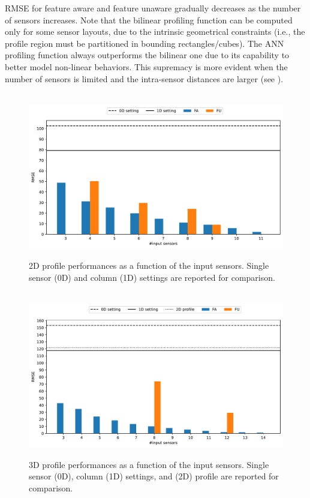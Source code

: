 RMSE for feature aware and feature unaware gradually decreases as the number of sensors increases. 
Note that the bilinear profiling function can be computed only for some sensor layouts, due to the intrinsic geometrical constraints (i.e., the profile region must be partitioned in bounding rectangles/cubes). 
The ANN profiling function always outperforms the bilinear one due to its capability to better model non-linear behaviors. 
This supremacy is more evident when the number of sensors is limited and the intra-sensor distances are larger (see ). 
\begin{figure}[t]
\centering\
\includegraphics[scale=.5]{chapters/physics-aware/pluto/img/bar_plot.pdf}
\caption{2D profile performances as a function of the input  sensors. Single sensor (0D) and column (1D) settings are reported for comparison. }
\label{pluto-fig:2Dperformance}
\end{figure}

\begin{figure}[t]
\centering\
\includegraphics[scale=.5]{chapters/physics-aware/pluto/img/3d_bar_plot.pdf}
\caption{3D profile performances as a function of the input  sensors. Single sensor (0D), column (1D) settings, and (2D) profile are reported for comparison.}
\label{pluto-fig:3Dperformance}
\end{figure}

